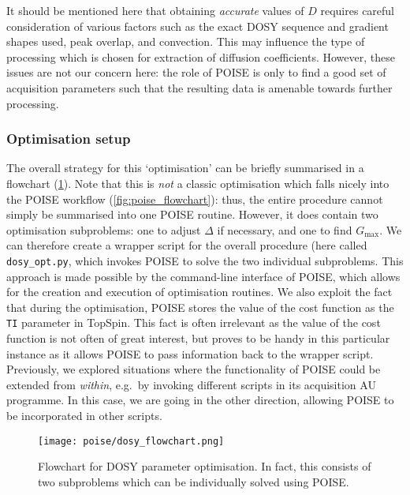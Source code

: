 It should be mentioned here that obtaining \textit{accurate} values of $D$ requires careful consideration of various factors such as the exact DOSY sequence and gradient shapes used\autocite{Sinnaeve2012CMR}, peak overlap\autocite{Antalek1996JACS,Windig1997CILS,Nilsson2006AC,Nilsson2008AC,Colbourne2011JACS}, and convection\autocite{Swan2015JMR,Barbosa2016RSCA}.
This may influence the type of processing which is chosen for extraction of diffusion coefficients.
However, these issues are not our concern here: the role of POISE is only to find a good set of acquisition parameters such that the resulting data is amenable towards further processing.



\subsubsection{Optimisation setup}

The overall strategy for this `optimisation' can be briefly summarised in a flowchart (\cref{fig:dosy_flowchart}).
Note that this is \textit{not} a classic optimisation which falls nicely into the POISE workflow (\cref{fig:poise_flowchart}): thus, the entire procedure cannot simply be summarised into one POISE routine.
However, it does contain two optimisation subproblems: one to adjust $\Delta$ if necessary, and one to find $G_\text{max}$.
We can therefore create a wrapper script for the overall procedure (here called \texttt{dosy\_opt.py}, which invokes POISE to solve the two individual subproblems.
This approach is made possible by the command-line interface of POISE, which allows for the creation and execution of optimisation routines.
We also exploit the fact that during the optimisation, POISE stores the value of the cost function as the \texttt{TI} parameter in TopSpin.
This fact is often irrelevant as the value of the cost function is not often of great interest, but proves to be handy in this particular instance as it allows POISE to pass information back to the wrapper script.
Previously, we explored situations where the functionality of POISE could be extended from \textit{within}, e.g.\ by invoking different scripts in its acquisition AU programme.
In this case, we are going in the other direction, allowing POISE to be incorporated in other scripts.

\begin{figure}[htb]
    \centering
    \texttt{[image: poise/dosy\_flowchart.png]}%
    \caption[Flowchart for DOSY parameter optimisation]{
        Flowchart for DOSY parameter optimisation. In fact, this consists of two subproblems which can be individually solved using POISE.
    }
    \label{fig:dosy_flowchart}
\end{figure}

